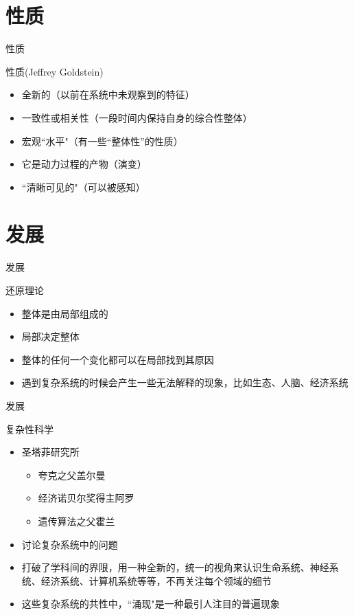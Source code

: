 \documentclass{beamer}
\begin{document}
\section{性质}
\begin{frame}{性质}
	\begin{block}{性质(Jeffrey Goldstein)}
		\begin{itemize}
		\item 全新的（以前在系统中未观察到的特征）
		\item 一致性或相关性（一段时间内保持自身的综合性整体）
		\item 宏观``水平"（有一些“整体性”的性质）
		\item 它是动力过程的产物（演变）
		\item ``清晰可见的"（可以被感知）
				\end{itemize}
	\end{block}
\end{frame}
\section{发展}
\begin{frame}{发展}
	\begin{block}{还原理论}
		\begin{itemize}
			\item 整体是由局部组成的
			\item 局部决定整体
			\item 整体的任何一个变化都可以在局部找到其原因
			\item 遇到复杂系统的时候会产生一些无法解释的现象，比如生态、人脑、经济系统
		\end{itemize}
	\end{block}
\end{frame}
\begin{frame}{发展}
	\begin{block}{复杂性科学}
		\begin{itemize}
			\item 圣塔菲研究所
			\begin{itemize}
				\item 夸克之父盖尔曼
				\item 经济诺贝尔奖得主阿罗
				\item 遗传算法之父霍兰
			\end{itemize}
			\item 讨论复杂系统中的问题 
			\item 打破了学科间的界限，用一种全新的，统一的视角来认识生命系统、神经系统、经济系统、计算机系统等等，不再关注每个领域的细节
			\item 这些复杂系统的共性中，``涌现"是一种最引人注目的普遍现象
		\end{itemize}
	\end{block}
	
\end{frame}
\end{document}
